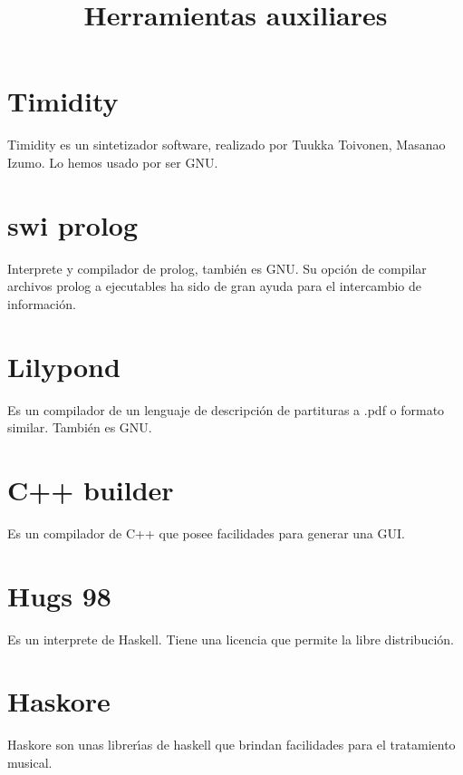 \documentclass[a4paper,11pt]{article}
\title{Herramientas auxiliares}
\begin{document}
\maketitle
\tableofcontents
\section{Timidity}
Timidity es un sintetizador software, realizado por Tuukka Toivonen, Masanao Izumo. Lo hemos usado por ser GNU.

\section{swi prolog}
Interprete y compilador de prolog, tambi\'en es GNU. Su opci\'on de compilar archivos prolog a ejecutables ha sido de gran ayuda para el intercambio de informaci\'on.

\section{Lilypond}
Es un compilador de un lenguaje de descripci\'on de partituras a .pdf o formato similar. Tambi\'en es GNU.

\section{C++ builder}
Es un compilador de C++ que posee facilidades para generar una GUI.

\section{Hugs 98}
Es un interprete de Haskell. Tiene una licencia que permite la libre distribuci\'on.

\section{Haskore}
Haskore son unas librer\'\i as de haskell que brindan facilidades para el tratamiento musical.
\end{document}
